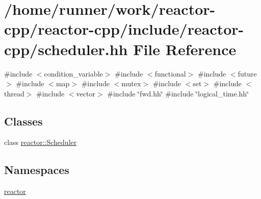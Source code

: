 \hypertarget{scheduler_8hh}{}\section{/home/runner/work/reactor-\/cpp/reactor-\/cpp/include/reactor-\/cpp/scheduler.hh File Reference}
\label{scheduler_8hh}
{\ttfamily \#include $<$condition\+\_\+variable$>$}\newline
{\ttfamily \#include $<$functional$>$}\newline
{\ttfamily \#include $<$future$>$}\newline
{\ttfamily \#include $<$map$>$}\newline
{\ttfamily \#include $<$mutex$>$}\newline
{\ttfamily \#include $<$set$>$}\newline
{\ttfamily \#include $<$thread$>$}\newline
{\ttfamily \#include $<$vector$>$}\newline
{\ttfamily \#include \char`\"{}fwd.\+hh\char`\"{}}\newline
{\ttfamily \#include \char`\"{}logical\+\_\+time.\+hh\char`\"{}}\newline
\subsection*{Classes}
\begin{DoxyCompactItemize}
\item 
class \hyperlink{classreactor_1_1Scheduler}{reactor\+::\+Scheduler}
\end{DoxyCompactItemize}
\subsection*{Namespaces}
\begin{DoxyCompactItemize}
\item 
 \hyperlink{namespacereactor}{reactor}
\end{DoxyCompactItemize}
